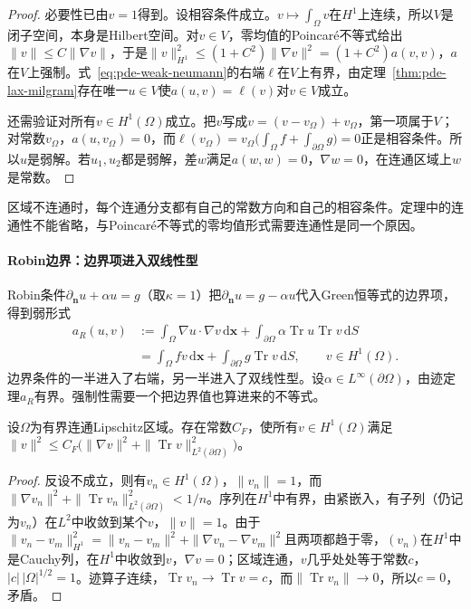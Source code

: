 \begin{proof}
必要性已由$v=1$得到。设相容条件成立。$v\mapsto\int_\Omega v$在$H^1$上连续，所以$V$是闭子空间，本身是Hilbert空间。对$v\in V$，零均值的Poincaré不等式给出$\|v\|\leq C\|\nabla v\|$，于是$\|v\|_{H^1}^2\leq(1+C^2)\|\nabla v\|^2=(1+C^2)a(v,v)$，$a$在$V$上强制。式~\eqref{eq:pde-weak-neumann}的右端$\ell$在$V$上有界，由定理~\ref{thm:pde-lax-milgram}存在唯一$u\in V$使$a(u,v)=\ell(v)$对$v\in V$成立。

还需验证对所有$v\in H^1(\Omega)$成立。把$v$写成$v=(v-v_\Omega)+v_\Omega$，第一项属于$V$；对常数$v_\Omega$，$a(u,v_\Omega)=0$，而$\ell(v_\Omega)=v_\Omega\bigl(\int_\Omega f+\int_{\partial\Omega}g\bigr)=0$正是相容条件。所以$u$是弱解。若$u_1,u_2$都是弱解，差$w$满足$a(w,w)=0$，$\nabla w=0$，在连通区域上$w$是常数。
\end{proof}

区域不连通时，每个连通分支都有自己的常数方向和自己的相容条件。定理中的连通性不能省略，与Poincaré不等式的零均值形式需要连通性是同一个原因。

\paragraph{Robin边界：边界项进入双线性型}
Robin条件$\partial_{\bm n}u+\alpha u=g$（取$\kappa=1$）把$\partial_{\bm n}u=g-\alpha u$代入Green恒等式的边界项，得到弱形式
\begin{equation}
  \begin{aligned}
    a_R(u,v)&:=\int_\Omega\nabla u\cdot\nabla v\,\mathrm d\bm x+\int_{\partial\Omega}\alpha\operatorname{Tr}u\operatorname{Tr}v\,\mathrm dS\\
    &=\int_\Omega fv\,\mathrm d\bm x+\int_{\partial\Omega}g\operatorname{Tr}v\,\mathrm dS,\qquad v\in H^1(\Omega).
  \end{aligned}
  \label{eq:pde-weak-robin}
\end{equation}
边界条件的一半进入了右端，另一半进入了双线性型。设$\alpha\in L^\infty(\partial\Omega)$，由迹定理$a_R$有界。强制性需要一个把边界值也算进来的不等式。

\begin{lemma}[带边界项的Poincaré型不等式]
\label{lem:pde-friedrichs}
设$\Omega$为有界连通Lipschitz区域。存在常数$C_F$，使所有$v\in H^1(\Omega)$满足$\|v\|^2\leq C_F\bigl(\|\nabla v\|^2+\|\operatorname{Tr}v\|_{L^2(\partial\Omega)}^2\bigr)$。
\end{lemma}

\begin{proof}
反设不成立，则有$v_n\in H^1(\Omega)$，$\|v_n\|=1$，而$\|\nabla v_n\|^2+\|\operatorname{Tr}v_n\|_{L^2(\partial\Omega)}^2<1/n$。序列在$H^1$中有界，由紧嵌入，有子列（仍记为$v_n$）在$L^2$中收敛到某个$v$，$\|v\|=1$。由于$\|v_n-v_m\|_{H^1}^2=\|v_n-v_m\|^2+\|\nabla v_n-\nabla v_m\|^2$且两项都趋于零，$(v_n)$在$H^1$中是Cauchy列，在$H^1$中收敛到$v$，$\nabla v=0$；区域连通，$v$几乎处处等于常数$c$，$|c|\,|\Omega|^{1/2}=1$。迹算子连续，$\operatorname{Tr}v_n\to\operatorname{Tr}v=c$，而$\|\operatorname{Tr}v_n\|\to0$，所以$c=0$，矛盾。
\end{proof}

